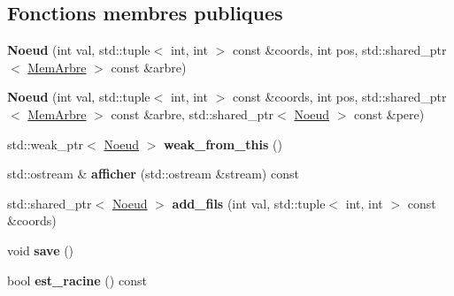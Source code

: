 \subsection*{Fonctions membres publiques}
\begin{DoxyCompactItemize}
\item 
{\bfseries Noeud} (int val, std\+::tuple$<$ int, int $>$ const \&coords, int pos, std\+::shared\+\_\+ptr$<$ \hyperlink{classMemArbre}{Mem\+Arbre} $>$ const \&arbre)\hypertarget{classMemArbre_1_1Noeud_a8fb60f07cdaa6c159102b5c28ccd904f}{}\label{classMemArbre_1_1Noeud_a8fb60f07cdaa6c159102b5c28ccd904f}

\item 
{\bfseries Noeud} (int val, std\+::tuple$<$ int, int $>$ const \&coords, int pos, std\+::shared\+\_\+ptr$<$ \hyperlink{classMemArbre}{Mem\+Arbre} $>$ const \&arbre, std\+::shared\+\_\+ptr$<$ \hyperlink{classMemArbre_1_1Noeud}{Noeud} $>$ const \&pere)\hypertarget{classMemArbre_1_1Noeud_a96ab7701e3ac3a755c66e2332f69cd7d}{}\label{classMemArbre_1_1Noeud_a96ab7701e3ac3a755c66e2332f69cd7d}

\item 
std\+::weak\+\_\+ptr$<$ \hyperlink{classMemArbre_1_1Noeud}{Noeud} $>$ {\bfseries weak\+\_\+from\+\_\+this} ()\hypertarget{classMemArbre_1_1Noeud_a4639b419945fdb26f7ba9c967559bcf3}{}\label{classMemArbre_1_1Noeud_a4639b419945fdb26f7ba9c967559bcf3}

\item 
std\+::ostream \& {\bfseries afficher} (std\+::ostream \&stream) const \hypertarget{classMemArbre_1_1Noeud_ae5c5794ad07ff855c5e472f10c890c38}{}\label{classMemArbre_1_1Noeud_ae5c5794ad07ff855c5e472f10c890c38}

\item 
std\+::shared\+\_\+ptr$<$ \hyperlink{classMemArbre_1_1Noeud}{Noeud} $>$ {\bfseries add\+\_\+fils} (int val, std\+::tuple$<$ int, int $>$ const \&coords)\hypertarget{classMemArbre_1_1Noeud_a738b4af9c935bc05dac33f4c48bed0cf}{}\label{classMemArbre_1_1Noeud_a738b4af9c935bc05dac33f4c48bed0cf}

\item 
void {\bfseries save} ()\hypertarget{classMemArbre_1_1Noeud_a710f476869b71d13a8e26eddd86a08f9}{}\label{classMemArbre_1_1Noeud_a710f476869b71d13a8e26eddd86a08f9}

\item 
bool {\bfseries est\+\_\+racine} () const \hypertarget{classMemArbre_1_1Noeud_abb962cfea5c62f59b00ba4d89be3bee9}{}\label{classMemArbre_1_1Noeud_abb962cfea5c62f59b00ba4d89be3bee9}


\end{DoxyCompactItemize}
